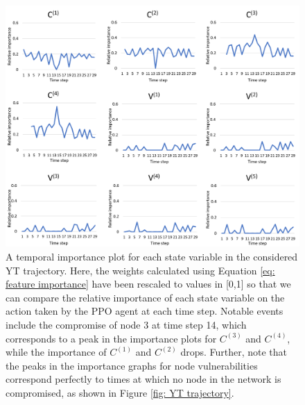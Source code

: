 \documentclass{article}
\begin{document}
\begin{figure}[htp]
    \centering
    \includegraphics[width=1.0\textwidth]{Images/Importance_graphs.png}
    \caption{A temporal importance plot for each state variable in the considered YT trajectory. Here, the weights calculated using Equation \ref{eq: feature importance} have been rescaled to values in [0,1] so that we can compare the relative importance of each state variable on the action taken by the PPO agent at each time step. Notable events include the compromise of node 3 at time step 14, which corresponds to a peak in the importance plots for $C^{(3)}$ and $C^{(4)}$, while the importance of $C^{(1)}$ and $C^{(2)}$ drops. Further, note that the peaks in the importance graphs for node vulnerabilities correspond perfectly to times at which no node in the network is compromised, as shown in Figure \ref{fig: YT trajectory}.}
    \label{fig: Importance graphs}
\end{figure}
\end{document}
